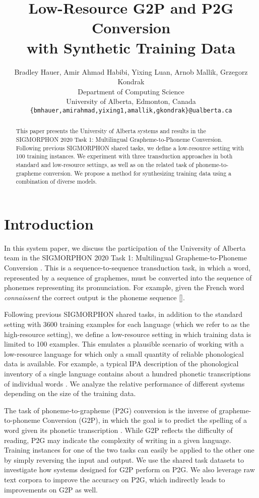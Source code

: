 \documentclass[11pt,a4paper]{article}
\title{Low-Resource G2P and P2G Conversion \\ with Synthetic Training Data}
\author{
 Bradley Hauer,
 Amir Ahmad Habibi,
 Yixing Luan,
 Arnob Mallik,
 Grzegorz Kondrak\\
 Department of Computing Science\\
 University of Alberta, Edmonton, Canada\\
 {\tt {\{bmhauer,amirahmad,yixing1,amallik,gkondrak\}}@ualberta.ca}
}
\date{}
\newcommand{\task}{SIGMORPHON 2020 Task 1: 
Multilingual Grapheme-to-Phoneme Conversion}
\begin{document}
\maketitle

\begin{abstract}
This paper presents 
the University of Alberta systems and results
in the \task{}.
Following previous SIGMORPHON shared tasks,
we define a low-resource setting  
with 100 training instances. 
We experiment with three transduction approaches
in both standard and low-resource settings,
as well as on 
the related task of phoneme-to-grapheme conversion.
We propose a method for synthesizing training data 
using a combination of diverse models.
\end{abstract}

\section{Introduction}
\label{intro}



In this system paper,
we discuss the participation of the University of Alberta team 
in the \task{} \cite{sigmorphon2020}. 
This is a sequence-to-sequence transduction task,
in which a word, represented by a sequence of graphemes,
must be converted into the sequence of phonemes
representing its pronunciation.
For example, given the French word {\em connaissent}
the correct output is the phoneme sequence [].


Following previous SIGMORPHON shared tasks,
in addition to the standard setting with 3600 training examples for
each language (which we refer to as the high-resource setting),
we define a low-resource setting %
in which training data is limited to 100 examples.
This emulates a plausible scenario 
of working with a low-resource language
for which only a small quantity 
of reliable phonological data is available.
For example, a typical IPA description of the phonological inventory
of a single language
contains about a hundred phonetic transcriptions of individual words
\cite{international1999handbook}.
We analyze the relative performance of different systems
depending on the size of the training data.


The task of phoneme-to-grapheme (P2G) conversion 
is the inverse of grapheme-to-phoneme Conversion (G2P),
in which the goal is to
predict the spelling of a word given its phonetic transcription 
\cite{rentzepopoulos1996}.
While G2P reflects the difficulty of reading,
P2G may indicate the complexity of writing in a given language.
Training instances for one of the two tasks
can easily be applied to the other one
by simply reversing the input and output.
We use the shared task datasets 
to investigate how systems designed for G2P perform on P2G.
We also leverage 
raw text corpora to improve the accuracy on P2G,
which indirectly leads to improvements on G2P as well. 
\end{document}
